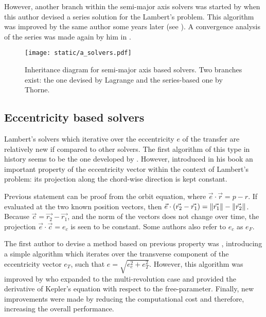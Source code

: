 However, another branch within the semi-major axis solvers was started by
\cite{thorne1995} when this author devised a series solution for the Lambert's
problem. This algorithm was improved by the same author some years later (see
\cite{thorne2004}). A convergence analysis of the series was made again by him
in \cite{thorne2015}.

\vspace{0.5cm}
\begin{figure}[h]
  \centering
  \texttt{[image: static/a\_solvers.pdf]}
  \caption[Semi-major axis based solvers]{Inheritance diagram for semi-major axis based solvers. Two branches
    exist: the one devised by Lagrange and the series-based one by Thorne.}
  \label{fig:a_solvers}
\end{figure}


\subsection{Eccentricity based solvers}
\label{sec:ecc_solvers}

Lambert's solvers which iterative over the eccentricity $e$ of the transfer are
relatively new if compared to other solvers. The first algorithm of this type in
history seems to be the one developed by \cite{escobal1965}. However,
\cite{Battin 1999} introduced in his book an important property of the
eccentricity vector within the context of Lambert's problem: its projection
along the chord-wise direction is kept constant.

Previous statement can be proof from the orbit equation, where $\vec{e} \cdot
  \vec{r} = p - r$. If evaluated at the two known position vectors, then $\vec{e}
  \cdot (\vec{r_2} - \vec{r_1}) = \lVert\vec{r_1}\rVert - \lVert\vec{r_2}\rVert$. Because
$\vec{c} = \vec{r_2} - \vec{r_1}$, and the norm of the vectors does not change
over time, the projection $\vec{e} \cdot \vec{c} = e_{c}$ is seen to be
constant. Some authors also refer to $e_{c}$ as $e_F$.

The first author to devise a method based on previous property was
\cite{avanzini2008}, introducing a simple algorithm which iterates over the
transverse component of the eccentricity vector $e_T$, such that $e =
  \sqrt{e_c^2 + e_T^2}$. However, this algorithm was improved by \cite{he2010} who
expanded to the multi-revolution case and provided the derivative of Kepler's
equation with respect to the free-parameter. Finally, new improvements were made
by \cite{wen2014} reducing the computational cost and therefore, increasing the
overall performance.

